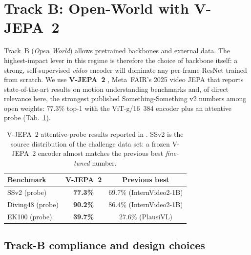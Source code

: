 %

\renewcommand{\trackcolor}{trackblue}
\renewcommand{\trackname}{Track~B}

\section{Track B: Open-World with V-JEPA~2}
\label{sec:trackb}

Track~B (\emph{Open World}) allows pretrained backbones and external
data. The highest-impact lever in this regime is therefore the choice of
backbone itself: a strong, self-supervised \emph{video} encoder will
dominate any per-frame ResNet trained from scratch. We use
\textbf{V-JEPA~2} \cite{Assran2025VJEPA2}, Meta~FAIR's 2025 video JEPA
that reports state-of-the-art results on motion understanding benchmarks
and, of direct relevance here, the strongest published Something-Something
v2 numbers among open weights: \(77.3\%\) top-1 with the ViT-g/16~384
encoder plus an attentive probe (Tab.~\ref{tab:vjepa2-bench}).

\begin{table}[h]
\centering\small
\begin{tabular}{lcc}
\toprule
\textbf{Benchmark} & \textbf{V-JEPA~2} & \textbf{Previous best} \\
\midrule
SSv2 (probe)     & \textbf{77.3\%} & 69.7\% (InternVideo2-1B) \\
Diving48 (probe) & \textbf{90.2\%} & 86.4\% (InternVideo2-1B) \\
EK100 (probe)    & \textbf{39.7\%} & 27.6\% (PlausiVL) \\
\bottomrule
\end{tabular}
\caption{V-JEPA~2 attentive-probe results reported in
\cite{Assran2025VJEPA2}. SSv2 is the source distribution of the
challenge data set: a frozen V-JEPA~2 encoder almost matches the
previous best \emph{fine-tuned} number.}
\label{tab:vjepa2-bench}
\end{table}

\subsection{Track-B compliance and design choices}

